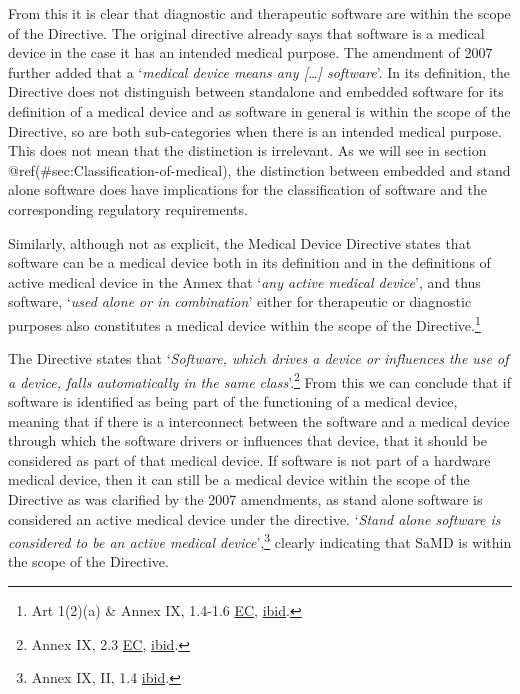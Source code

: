 \documentclass[
]{scrartcl}
\begin{document}
From this it is clear that diagnostic and therapeutic software are within the scope of the Directive. The original directive already says that software is a medical device in the case it has an intended medical purpose. The amendment of 2007 further added that a `\emph{medical device means any {[}\ldots{]} software}'. In its definition, the Directive does not distinguish between standalone and embedded software for its definition of a medical device and as software in general is within the scope of the Directive, so are both sub-categories when there is an intended medical purpose. This does not mean that the distinction is irrelevant. As we will see in section @ref(\#sec:Classification-of-medical), the distinction between embedded and stand alone software does have implications for the classification of software and the corresponding regulatory requirements.

Similarly, although not as explicit, the Medical Device Directive states that software can be a medical device both in its definition and in the definitions of active medical device in the Annex that `\emph{any active medical device}', and thus software, `\emph{used alone or in combination}' either for therapeutic or diagnostic purposes also constitutes a medical device within the scope of the Directive.\footnote{Art 1(2)(a) \& Annex IX, 1.4-1.6 \protect\hyperlink{ref-ecCOUNCILDIRECTIVE931993}{EC}, \protect\hyperlink{ref-ecCOUNCILDIRECTIVE931993}{ibid}.}

The Directive states that `\emph{Software, which drives a device or influences the use of a device, falls automatically in the same class}'.\footnote{Annex IX, 2.3 \protect\hyperlink{ref-ecCOUNCILDIRECTIVE931993}{EC}, \protect\hyperlink{ref-ecCOUNCILDIRECTIVE931993}{ibid}.} From this we can conclude that if software is identified as being part of the functioning of a medical device, meaning that if there is a interconnect between the software and a medical device through which the software drivers or influences that device, that it should be considered as part of that medical device. If software is not part of a hardware medical device, then it can still be a medical device within the scope of the Directive as was clarified by the 2007 amendments, as stand alone software is considered an active medical device under the directive. `\emph{Stand alone software is considered to be an active medical device}',\footnote{Annex IX, II, 1.4 \protect\hyperlink{ref-ecCOUNCILDIRECTIVE931993}{ibid}.} clearly indicating that SaMD is within the scope of the Directive.
\end{document}
